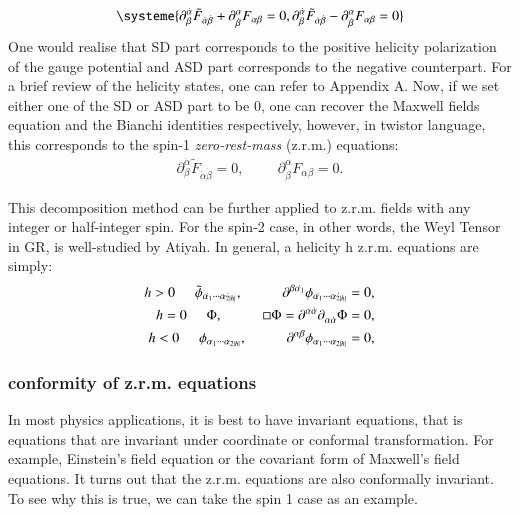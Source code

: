 \documentclass{article}
\begin{document}
\begin{align}
  \label{2-spinor representation of maxwell equation}
  \systeme{
  \partial_{\beta}^{\dot{\alpha}} \tilde
  F_{\dot{\alpha} \dot{\beta}} + \partial_{\dot{\beta}}^{\alpha}
  F_{\alpha \beta} = 0,
  \partial_{\beta}^{\dot{\alpha}} \tilde
  F_{\dot{\alpha} \dot{\beta}} - \partial_{\dot{\beta}}^{\alpha}
  F_{\alpha \beta} = 0
  }
\end{align}
One would realise that SD part corresponds to the positive helicity
polarization of the gauge potential and ASD part corresponds to the negative
counterpart. For a brief review of the helicity states, one can refer to
Appendix A. Now, if we set either one of the SD or ASD part to be 0, one can
recover the Maxwell fields equation and the Bianchi identities respectively,
however, in twistor language, this corresponds to the spin-1
\textit{zero-rest-mass} (z.r.m.) equations: 
\begin{align}
  \label{z.r.m. equations}
  \partial_{\beta}^{\dot{\alpha}} \tilde F_{\dot{\alpha} \dot{\beta}}
  = 0, \hspace{1cm} \partial_{\dot{\beta}}^{\alpha}
  F_{\alpha \beta} = 0.
\end{align}

This decomposition method can be further applied to z.r.m. fields with
any integer or half-integer spin. For the spin-2 case, in other words, the Weyl
Tensor in GR, is well-studied by
Atiyah\cite{atiyah1978self}. In general, a helicity h z.r.m. equations
are
simply: 
\begin{align}
  \label{z.r.m. equation of helicity h}
  h > 0 \hspace{0.5cm} \tilde \phi_{\dot{\alpha_1}
  \cdots \dot{\alpha_{2|h|}}}, \hspace{1cm} \partial_{}^{\beta
  \dot{\alpha_1}} \phi_{\dot{\alpha_1}
  \cdots \dot{\alpha_{2|h|}}} = 0, \\ 
  h = 0 \hspace{0.5cm} \Phi, \hspace{1cm} \square \Phi =
  \partial_{}^{\alpha \dot{\alpha}} \partial_{\alpha \dot{\alpha}}^{}
  \Phi = 0, \\ 
  h < 0 \hspace{0.5cm} \phi_{\alpha_1
  \cdots \alpha_{2|h|}}, \hspace{1cm} \partial_{}^{\alpha \beta
  } \phi_{\alpha_1
  \cdots \alpha_{2|h|}} = 0, 
\end{align}

\subsubsection{conformity of z.r.m. equations}%
  \label{sub:conformity of z.r.m. equations}
 In most physics applications, it is best to have invariant equations,
 that is equations that are invariant under coordinate or conformal
 transformation. For example, Einstein's field equation or the covariant
 form of Maxwell's field equations. It turns out that the z.r.m. equations
 are also conformally invariant. To see why this is true, we can take the
 spin 1 case as an example. 
\end{document}
